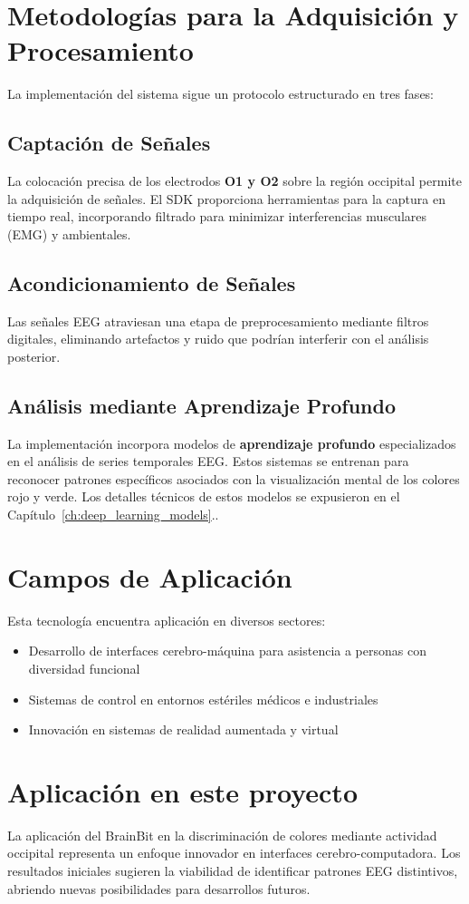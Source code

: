 \section{Metodologías para la Adquisición y Procesamiento}
La implementación del sistema sigue un protocolo estructurado en tres fases:

    \subsection{Captación de Señales}
    La colocación precisa de los electrodos \textbf{O1 y O2} sobre la región occipital permite la adquisición de señales. El SDK proporciona herramientas para la captura en tiempo real, incorporando filtrado para minimizar interferencias musculares (EMG) y ambientales.

    \subsection{Acondicionamiento de Señales}
    Las señales EEG atraviesan una etapa de preprocesamiento mediante filtros digitales, eliminando artefactos y ruido que podrían interferir con el análisis posterior.

    \subsection{Análisis mediante Aprendizaje Profundo}
    La implementación incorpora modelos de \textbf{aprendizaje profundo} especializados en el análisis de series temporales EEG. Estos sistemas se entrenan para reconocer patrones específicos asociados con la visualización mental de los colores rojo y verde. Los detalles técnicos de estos modelos se expusieron en el Capítulo~\ref{ch:deep_learning_models}..

\section{Campos de Aplicación}
Esta tecnología encuentra aplicación en diversos sectores:

    \begin{itemize}
        \item Desarrollo de interfaces cerebro-máquina para asistencia a personas con diversidad funcional
        \item Sistemas de control en entornos estériles médicos e industriales
        \item Innovación en sistemas de realidad aumentada y virtual
    \end{itemize}

\section{Aplicación en este proyecto}
La aplicación del BrainBit en la discriminación de colores mediante actividad occipital representa un enfoque innovador en interfaces cerebro-computadora. Los resultados iniciales sugieren la viabilidad de identificar patrones EEG distintivos, abriendo nuevas posibilidades para desarrollos futuros.

